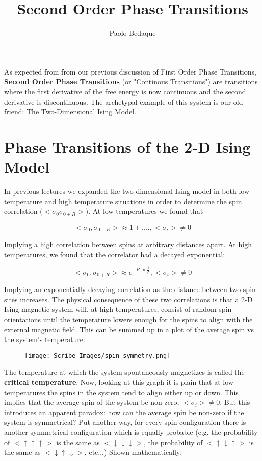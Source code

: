 \documentclass{article}
\title{Second Order Phase Transitions}
\author{Paolo Bedaque}
\begin{document}
\maketitle

As expected from from our previous discussion of First Order Phase Transitions, \textbf{Second Order Phase Transitions} (or "Continous Transitions") are transitions where the first derivative of the free energy is now continuous and the second derivative is discontinuous.  The archetypal example of this system is our old friend: The Two-Dimensional Ising Model.

\section{Phase Transitions of the 2-D Ising Model}

In previous lectures we expanded the two dimensional Ising model in both low temperature and high temperature situations in order to determine the spin correlation ($<\sigma_{0}\sigma_{0+R}>$).  At low temperatures we found that

$$<\sigma_{0},\sigma_{0+R}>\approx1+...., <\sigma_{i}>\neq0$$

Implying a high correlation between spins at arbitrary distances apart.  At high temperatures, we found that the correlator had a decayed exponential:

$$<\sigma_{0},\sigma_{0+R}>\approx e^{-R\ln{\frac{1}{\beta}}}, <\sigma_{i}>\neq0$$

Implying an exponentially decaying correlation as the distance between two spin sites increases.  The physical consequence of these two correlations is that a 2-D Ising magnetic system will, at high temperatures, consist of random spin orientations until the temperature lowers enough for the spins to align with the external magnetic field.  This can be summed up in a plot of the average spin vs the system's temperature:

\begin{figure}[H]
	\centering
	\texttt{[image: Scribe\_Images/spin\_symmetry.png]}
\end{figure}

The temperature at which the system spontaneously magnetizes is called the \textbf{critical temperature}.  Now, looking at this graph it is plain that at low temperatures the spins in the system tend to align either up or down.  This implies that the average spin of the system be non-zero, $<\sigma_{i}>\neq0$.  But this introduces an apparent paradox: how can the average spin be non-zero if the system is symmetrical?  Put another way, for every spin configuration there is another symmetrical configuration which is equally probable (e.g. the probability of $<\uparrow\uparrow\uparrow>$ is the same as $<\downarrow\downarrow\downarrow>$, the probability of $<\uparrow\downarrow\uparrow>$ is the same as $<\downarrow\uparrow\downarrow>$, etc...)  Shown mathematically:
\end{document}

